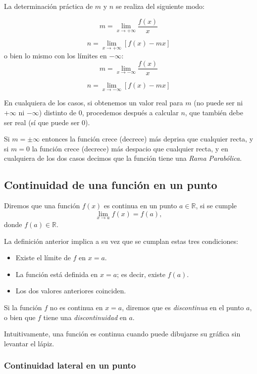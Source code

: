 La determinación práctica de $m$ y $n$ se realiza del siguiente
modo:

\[
m = \mathop {\lim }\limits_{x \to  + \infty } \frac{{f(x)}} {x}
\]

\[
n = \mathop {\lim }\limits_{x \to  + \infty } \left[ {f(x) - mx}
\right]
\]
o bien lo mismo con los límites en $-\infty$:
\[
m = \mathop {\lim }\limits_{x \to  - \infty } \frac{{f(x)}} {x}
\]

\[
n = \mathop {\lim }\limits_{x \to  - \infty } \left[ {f(x) - mx}
\right]
\]

En cualquiera de los casos, si obtenemos un valor real para $m$ (no
puede ser ni $+\infty$ ni $-\infty$) distinto de $0$, procedemos
después a calcular $n$, que también debe ser real (sí que puede ser
$0$).

Si $m=\pm\infty$ entonces la función crece (decrece) más deprisa que
cualquier recta, y si $m=0$ la función crece (decrece) más despacio
que cualquier recta, y en cualquiera de los dos casos decimos que la
función tiene una \emph{Rama Parabólica}.

\subsection{Continuidad de una función en un punto}
Diremos que una función $f(x)$ es continua en un punto $a\in
\mathbb{R}$, si se cumple
\[ \lim_{x\rightarrow a}f(x)=f(a),\]
donde $f(a)\in \mathbb{R}$.

La definición anterior implica a su vez que se cumplan estas tres
condiciones:

\begin{itemize}

\item Existe el límite de $f$ en $x=a$.

\item La función está definida en $x=a$; es decir, existe $f(a)$.

\item Los dos valores anteriores coinciden.

\end{itemize}

Si la función $f$ no es continua en $x=a$, diremos que es
\emph{discontinua} en el punto $a$, o bien que $f$ tiene una
\emph{discontinuidad} en $a$.

Intuitivamente, una función es continua cuando puede dibujarse su
gráfica sin levantar el lápiz.

\subsubsection*{Continuidad lateral en un punto}

